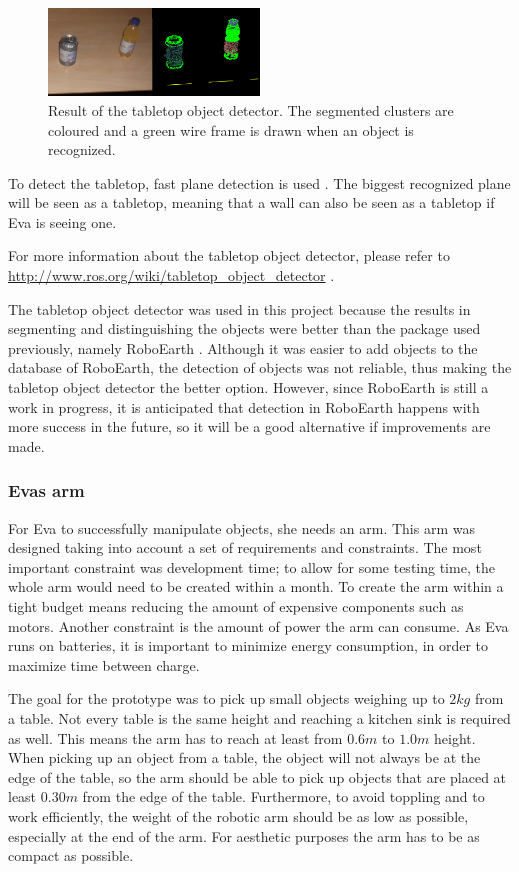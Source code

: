 \documentclass[project_eva.tex]{subfiles}
\begin{document}
\begin{figure}[h]
	\centering
	\mbox{\includegraphics[width=0.5\textwidth]{Images/object_detector.png}}
	\caption{Result of the tabletop object detector. The segmented clusters are coloured and a green wire frame is drawn 
	when an object is recognized.}
	\label{fig:tabletop}
\end{figure}

To detect the tabletop, fast plane detection is used \cite{plane}. The biggest recognized plane will be seen as a 
tabletop, meaning that a wall can also be seen as a 
tabletop if Eva is seeing one.

For more information about the tabletop object detector, please refer to 
\url{http://www.ros.org/wiki/tabletop\_object\_detector} \cite{tabletop}.

The tabletop object detector was used in this project because the results in segmenting and distinguishing the objects 
were better than the package used previously, namely RoboEarth \cite{Roboearth}. Although it was easier to add objects to 
the database of RoboEarth, the detection of objects was not reliable, thus making the tabletop object detector the 
better option. However, since RoboEarth is still a work in progress, it is anticipated that detection in RoboEarth 
happens with more success in the future, so it will be a good alternative if improvements are made.

\subsubsection*{Eva\textquotesingle s arm}
For Eva to successfully manipulate objects, she needs an arm. This arm was designed taking into account a set of 
requirements and constraints. The most important constraint was development time; to allow for some testing time, the 
whole arm would need to be created within a month. To create the arm within a tight budget means reducing the amount of 
expensive components such as motors. Another constraint is the amount of power the arm can consume. As Eva runs on 
batteries, it is important to minimize energy consumption, in order to maximize time between charge.

The goal for the prototype was to pick up small objects weighing up to $2kg$ from a table. Not every table is the same 
height and reaching a kitchen sink is required as well. This means the arm has to reach at least from $0.6m$ to $1.0m$ 
height. When picking up an object from a table, the object will not always be at the edge of the table, so the arm should 
be able to pick up objects that are placed at least $0.30m$ from the edge of the table. Furthermore, to avoid toppling 
and to work efficiently, the weight of the robotic arm should be as low as possible, especially at the end of the arm. 
For aesthetic purposes the arm has to be as compact as possible.
\end{document}
